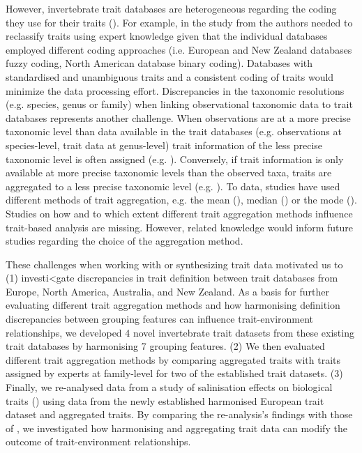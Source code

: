 \documentclass{article}
\begin{document}
However, invertebrate trait databases are heterogeneous regarding the coding they use for their traits (\cite{culp_incorporating_2011}). For example, in the study from \citet{brown_functional_2018} the authors needed to reclassify traits using expert knowledge given that the individual databases employed different coding approaches (i.e. European and New Zealand databases fuzzy coding, North American database binary coding). Databases with standardised and unambiguous traits and a consistent coding of traits would minimize the data processing effort. Discrepancies in the taxonomic resolutions (e.g. species, genus or family) when linking observational taxonomic data to trait databases represents another challenge. When observations are at a more precise taxonomic level than data available in the trait databases (e.g. observations at species-level, trait data at genus-level) trait information of the less precise taxonomic level is often assigned (e.g. \cite{szocs_effects_2014, vos_taxonomic_2017}). Conversely, if trait information is only available at more precise taxonomic levels than the observed taxa, traits are aggregated to a less precise taxonomic level (e.g. \cite{aspin_extreme_2019, piliere_a._f._h._importance_2016, poff_functional_2006, szocs_effects_2014}). To data, studies have used different methods of trait aggregation, e.g. the mean (\cite{magliozzi_functional_2019}), median (\cite{szocs_effects_2014}) or the mode (\cite{piliere_a._f._h._importance_2016}). Studies on how and to which extent different trait aggregation methods influence trait-based analysis are missing. However, related knowledge would inform future studies regarding the choice of the aggregation method.

These challenges when working with or synthesizing trait data motivated us to (1) investi<gate discrepancies in trait definition between trait databases from Europe, North America, Australia, and New Zealand. As a basis for further evaluating different trait aggregation methods and how harmonising definition discrepancies between grouping features can influence trait-environment relationships, we developed 4 novel invertebrate trait datasets from these existing trait databases by harmonising 7 grouping features. (2) We then evaluated different trait aggregation methods by comparing aggregated traits with traits assigned by experts at family-level for two of the established trait datasets. (3) Finally, we re-analysed data from a study of salinisation effects on biological traits (\cite{szocs_effects_2014}) using data from the newly established harmonised European trait dataset and aggregated traits. By comparing the re-analysis's findings with those of \citet{szocs_effects_2014}, we investigated how harmonising and aggregating trait data can modify the outcome of trait-environment relationships.
\end{document}
